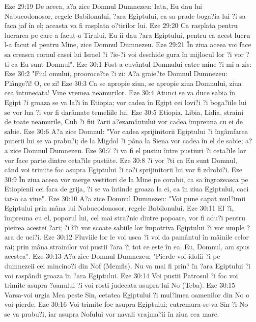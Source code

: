 Eze 29:19  De aceea, a?a zice Domnul Dumnezeu: Iata, Eu dau lui Nabucodonosor, regele Babilonului, ?ara Egiptului, ca sa prade boga?ia lui ?i sa faca jaf în el; aceasta va fi rasplata o?tirilor lui.
Eze 29:20  Ca rasplata pentru lucrarea pe care a facut-o Tirului, Eu îi dau ?ara Egiptului, pentru ca acest lucru l-a facut el pentru Mine, zice Domnul Dumnezeu.
Eze 29:21  În ziua aceea voi face sa creasca cornul casei lui Israel ?i ?ie-?i voi deschide gura în mijlocul lor ?i vor ?ti ca Eu sunt Domnul".
Eze 30:1  Fost-a cuvântul Domnului catre mine ?i mi-a zis:
Eze 30:2  "Fiul omului, prooroce?te ?i zi: A?a graie?te Domnul Dumnezeu: Plânge?i! O, ce zi!
Eze 30:3  Ca se apropie ziua, se apropie ziua Domnului, ziua cea întunecata! Vine vremea neamurilor.
Eze 30:4  Atunci se va duce sabia în Egipt ?i groaza se va la?i în Etiopia; vor cadea în Egipt cei lovi?i ?i boga?iile lui se vor lua ?i vor fi darâmate temeliile lui.
Eze 30:5  Etiopia, Libia, Lidia, straini de toate neamurile, Cub ?i fiii ?arii a?ezamântului vor cadea împreuna cu ei de sabie.
Eze 30:6  A?a zice Domnul: "Vor cadea sprijinitorii Egiptului ?i îngâmfarea puterii lui se va prabu?i; de la Migdol ?i pâna la Siena vor cadea în el de sabie; a?a zice Domnul Dumnezeu.
Eze 30:7  ?i va fi el pustiu între pustiuri ?i ceta?ile lor vor face parte dintre ceta?ile pustiite.
Eze 30:8  ?i vor ?ti ca Eu sunt Domnul, când voi trimite foc asupra Egiptului ?i to?i sprijinitorii lui vor fi zdrobi?i.
Eze 30:9  În ziua aceea vor merge vestitori de la Mine pe corabii, ca sa îngrozeasca pe Etiopienii cei fara de grija, ?i se va întinde groaza la ei, ca în ziua Egiptului, caci iat-o ca vine".
Eze 30:10  A?a zice Domnul Dumnezeu: "Voi pune capat mul?imii Egiptului prin mâna lui Nabucodonosor, regele Babilonului.
Eze 30:11  El ?i, împreuna cu el, poporul lui, cel mai stra?nic dintre popoare, vor fi adu?i pentru pieirea acestei ?ari; ?i î?i vor scoate sabiile lor împotriva Egiptului ?i vor umple ?ara de uci?i.
Eze 30:12  Fluviile lor le voi usca ?i voi da pamântul în mâinile celor rai; prin mâna strainilor voi pustii ?ara ?i tot ce este în ea. Eu, Domnul, am spus acestea".
Eze 30:13  A?a zice Domnul Dumnezeu: "Pierde-voi idolii ?i pe dumnezeii cei mincino?i din Nof (Memfis). Nu va mai fi prin? în ?ara Egiptului ?i voi raspândi groaza în ?ara Egiptului.
Eze 30:14  Voi pustii Patrosul ?i foc voi trimite asupra ?oanului ?i voi rosti judecata asupra lui No (Teba).
Eze 30:15  Varsa-voi urgia Mea peste Sin, cetatea Egiptului ?i mul?imea oamenilor din No o voi pierde.
Eze 30:16  Voi trimite foc asupra Egiptului; cutremura-se-va Sin ?i No se va prabu?i, iar asupra Nofului vor navali vrajma?ii în ziua cea mare.
